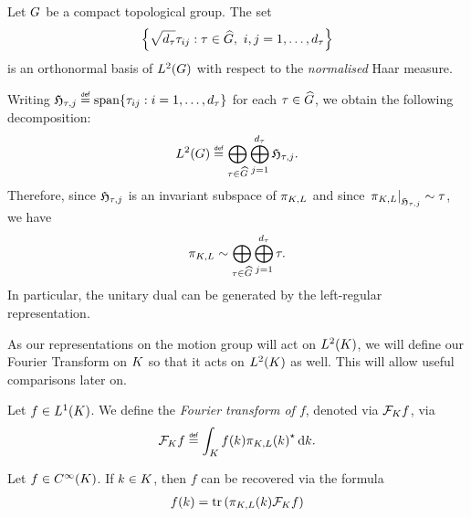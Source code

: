 \begin{theorem}
\label{theorem:Peter-Weyl_theorem}
    Let $\Group$ be a compact topological group.
    The set
    \begin{align*}
        \left\{
            \sqrt{\dimRep\tau} \tau_{ij} : \tau \in \dualGroup\Group,\ i, j = 1, \dots, \dimRep\tau
        \right\}
    \end{align*}
    is an orthonormal basis of $\Lebesgue{2}{\Group}$ with respect to the \emph{normalised} Haar measure.

    Writing $\Hilbert{\tau}{j} \defeq \Span\{\tau_{ij} : i = 1, \dots, \dimRep\tau\}$
    for each $\tau \in \dualGroup\Group$,
    we obtain the following decomposition:
    \begin{align*}
        \Lebesgue{2}{\Group} \defeq
        \bigoplus_{\tau \in \dualGroup\Group} \bigoplus_{j = 1}^{\dimRep \tau} \Hilbert{\tau}{j}.
    \end{align*}
    Therefore,
    since $\Hilbert{\tau}{j}$ is an invariant subspace of $\LeftRegularRepresentation$
    and since $\eval{\LeftRegularRepresentation}{\Hilbert{\tau}{j}} \sim \tau$,
    we have
    \begin{align*}
        \LeftRegularRepresentation \sim
        \bigoplus_{\tau \in \dualGroup\Group} \bigoplus_{j = 1}^{\dimRep \tau} \tau.
    \end{align*}
    In particular, the unitary dual can be generated by the left-regular representation.
\end{theorem}

As our representations on the motion group will act on $\Lebesgue{2}\CompactGroup$,
we will define our Fourier Transform on $\CompactGroup$ so that it acts on $\Lebesgue{2}\CompactGroup$ as well.
This will allow useful comparisons later on.

\begin{definition}
    Let $f \in \Lebesgue{1}\CompactGroup$.
    We define the \emph{Fourier transform of $f$}, denoted via $\Fourier[\CompactGroup] f$, via
    \begin{align*}
        \Fourier[\CompactGroup] f \defeq \int_\CompactGroup f(k) \adj{\LeftRegularRepresentation(k)} \dd k.
    \end{align*}
\end{definition}

\begin{proposition}
    Let $f \in \SmoothFunctions\CompactGroup$.
    If $k \in \CompactGroup$,
    then $f$ can be recovered via the formula
    \begin{align*}
        f(k) = \tr\left(\LeftRegularRepresentation(k) \Fourier[\CompactGroup] f \right)
    \end{align*}
\end{proposition}

